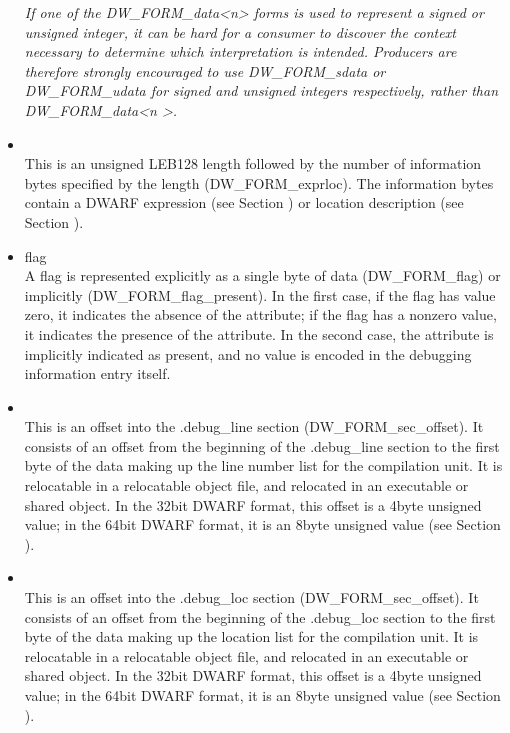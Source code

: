 \begin{itemize}
\textit{If one of the DW\-\_FORM\-\_data<n> forms is used to represent a
signed or unsigned integer, it can be hard for a consumer
to discover the context necessary to determine which
interpretation is intended. Producers are therefore strongly
encouraged to use DW\-\_FORM\-\_sdata or DW\-\_FORM\-\_udata for signed and
unsigned integers respectively, rather than 
DW\-\_FORM\-\_data\textless n \textgreater.}


\item {} \\
This is an unsigned LEB128 length followed by the
number of information bytes specified by the length
(DW\-\_FORM\-\_exprloc). The information bytes contain a DWARF
expression 
(see Section ) 
or location description 
(see Section ).

\item flag \\
A flag is represented explicitly as a single byte of data
(DW\-\_FORM\-\_flag) or implicitly (DW\-\_FORM\-\_flag\-\_present). In the
first case, if the flag has value zero, it indicates the
absence of the attribute; if the flag has a non\dash zero value,
it indicates the presence of the attribute. In the second
case, the attribute is implicitly indicated as present, and
no value is encoded in the debugging information entry itself.

\item {} \\
This is an offset into the .debug\_line section
(DW\-\_FORM\-\_sec\-\_offset). It consists of an offset from the
beginning of the .debug\_line section to the first byte of
the data making up the line number list for the compilation
unit. 
It is relocatable in a relocatable object file, and
relocated in an executable or shared object. In the 32\dash bit
DWARF format, this offset is a 4\dash byte unsigned value;
in the 64\dash bit DWARF format, it is an 8\dash byte unsigned value
(see Section ).


\item {} \\
This is an offset into the .debug\_loc section
(DW\-\_FORM\-\_sec\-\_offset). It consists of an offset from the
beginning of the .debug\_loc section to the first byte of
the data making up the location list for the compilation
unit. 
It is relocatable in a relocatable object file, and
relocated in an executable or shared object. In the 32\dash bit
DWARF format, this offset is a 4\dash byte unsigned value;
in the 64\dash bit DWARF format, it is an 8\dash byte unsigned value
(see Section ).



\end{itemize}
